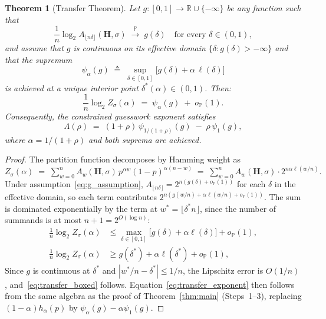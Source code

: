 \documentclass[journal,10pt,onecolumn]{IEEEtran}
\newtheorem{theorem}{Theorem}
\newcommand{\Pb}{\mathbb{P}}
\newcommand{\Hm}{\mathbf{H}}
\begin{document}
\begin{theorem}[Transfer Theorem]
\label{thm:transfer}
Let $g:[0,1]\to\mathbb{R}\cup\{-\infty\}$ be any function such that
\begin{equation}
    \frac{1}{n}\log_2 A_{\lfloor n\delta\rfloor}(\Hm,\sigma)
    \;\xrightarrow{\;\Pb\;}\;
    g(\delta)
    \quad\text{for every }\delta\in(0,1),
    \label{eq:g_assumption}
\end{equation}
and assume that $g$ is continuous on its effective domain
$\{\delta:g(\delta)>-\infty\}$ and that the supremum
\begin{equation}
    \psi_\alpha(g)
    \;\triangleq\;
    \sup_{\delta\in[0,1]}
    \bigl[g(\delta)+\alpha\,\ell(\delta)\bigr]
    \label{eq:Gamma_def}
\end{equation}
is achieved at a unique interior point $\delta^*(\alpha)\in(0,1)$.
Then:
\begin{equation}
    \frac{1}{n}\log_2 Z_\sigma(\alpha)
    \;=\;
    \psi_\alpha(g)
    \;+\;o_{\Pb}(1).
\label{eq:transfer_boxed}
\end{equation}
Consequently, the constrained guesswork exponent satisfies
\begin{equation}
    \Lambda(\rho)
    \;=\;
    (1+\rho)\,\psi_{1/(1+\rho)}(g)
    \;-\;
    \rho\,\psi_1(g),
    \label{eq:transfer_exponent}
\end{equation}
where $\alpha=1/(1+\rho)$ and both suprema are achieved.
\end{theorem}

\begin{proof}
The partition function decomposes by Hamming weight as
\(
    Z_\sigma(\alpha)
    \;=\;
    \sum_{w=0}^n
    A_w(\Hm,\sigma)\,p^{\alpha w}(1-p)^{\alpha(n-w)}
    \;=\;
    \sum_{w=0}^n
    A_w(\Hm,\sigma)\cdot 2^{n\alpha\ell(w/n)}.
\)
Under assumption~\eqref{eq:g_assumption}, $A_{\lfloor n\delta\rfloor}
=2^{n(g(\delta)+o_\Pb(1))}$ for each $\delta$ in the effective
domain, so each term contributes $2^{n(g(w/n)+\alpha\ell(w/n)+o_\Pb(1))}$.
The sum is dominated exponentially by the term at $w^*=\lfloor\delta^*
n\rfloor$, since the number of summands is at most $n+1=2^{O(\log n)}$:
\begin{align}
\frac{1}{n}\log_2 Z_\sigma(\alpha)
&\le
\max_{\delta\in[0,1]}
\bigl[g(\delta)+\alpha\ell(\delta)\bigr]
+o_\Pb(1),
\\
\frac{1}{n}\log_2 Z_\sigma(\alpha)
&\ge
g(\delta^*)+\alpha\ell(\delta^*)
+o_\Pb(1),
\end{align}
Since $g$ is continuous at $\delta^*$ and $|w^*/n-\delta^*|\le 1/n$,
the Lipschitz error is $O(1/n)$, and~\eqref{eq:transfer_boxed} follows.
Equation~\eqref{eq:transfer_exponent} then follows from
the same algebra as the proof of Theorem~\ref{thm:main}
(Steps~1--3), replacing $(1-\alpha)h_\alpha(p)$ by $\psi_\alpha(g)-\alpha\psi_1(g)$.
\end{proof}
\end{document}
